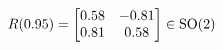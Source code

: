 \documentclass[preview]{standalone}
\begin{document}
\begin{align*}
\special{dvisvgm:raw <g id='unique000'>}R(0.95) = \begin{bmatrix} 0.58 & -0.81 \\ 0.81 & 0.58 \end{bmatrix} \in \text{SO}(2)\special{dvisvgm:raw </g>}
\end{align*}
\end{document}
